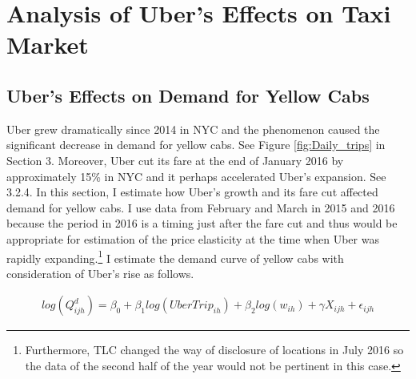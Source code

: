 \vspace{1.0cm}
\section{Analysis of Uber's Effects on Taxi Market}
\subsection{Uber's Effects on Demand for Yellow Cabs}

\hspace{0.5cm} Uber grew dramatically since 2014 in NYC and the phenomenon caused the significant decrease in demand for yellow cabs. See Figure \ref{fig:Daily_trips} in Section 3. Moreover, Uber cut its fare at the end of January 2016 by approximately 15\% in NYC and it perhaps accelerated Uber's expansion. See 3.2.4. In this section, I estimate how Uber's growth and its fare cut affected demand for yellow cabs. I use data from February and March in 2015 and 2016 because the period in 2016 is a timing just after the fare cut and thus would be appropriate for estimation of the price elasticity at the time when Uber was rapidly expanding.\footnote{Furthermore, TLC changed the way of disclosure of locations in July 2016 so the data of the second half of the year would not be pertinent in this case.} I estimate the demand curve of yellow cabs with consideration of Uber's rise as follows.

\begin{equation}
\begin{split}
 log(Q^d_{ijh}) = \beta_0 + \beta_1 log(UberTrip_{ih}) + \beta_2 log(w_{ih}) + \gamma X_{ijh} +  \epsilon_{ijh} \label{eq:lnuber}
\end{split}
\end{equation}

